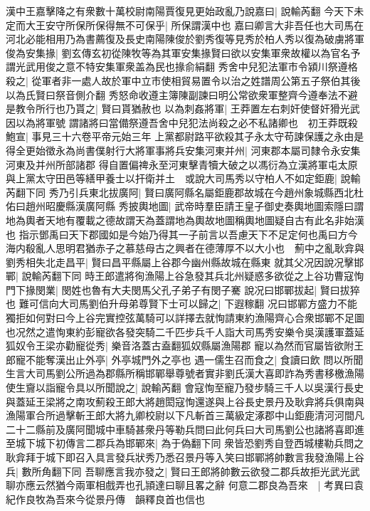 漢中王嘉擊降之有衆數十萬校尉南陽賈復見更始政亂乃說嘉曰|{
	說輸芮翻}
今天下未定而大王安守所保所保得無不可保乎|{
	所保謂漢中也}
嘉曰卿言大非吾任也大司馬在河北必能相用乃為書薦復及長史南陽陳俊於劉秀復等見秀於柏人秀以復為破虜將軍俊為安集掾|{
	劉玄傳玄初從陳牧等為其軍安集掾賢曰欲以安集軍衆故權以為官名予謂光武用俊之意不特安集軍衆盖為民也掾俞絹翻}
秀舍中兒犯法軍市令潁川祭遵格殺之|{
	從軍者非一處人故於軍中立市使相貿易置令以治之姓譜周公第五子祭伯其後以為氏賢曰祭音側介翻}
秀怒命收遵主簿陳副諫曰明公常欲衆軍整齊今遵奉法不避是教令所行也乃貰之|{
	賢曰貰猶赦也}
以為刺姦將軍|{
	王莽置左右刺奸使督奸猾光武因以為將軍號}
謂諸將曰當備祭遵吾舍中兒犯法尚殺之必不私諸卿也　初王莽既殺鮑宣|{
	事見三十六卷平帝元始三年}
上黨都尉路平欲殺其子永太守苟諫保護之永由是得全更始徵永為尚書僕射行大將軍事將兵安集河東并州|{
	河東郡本屬司隸令永安集河東及并州所部諸郡}
得自置偏禆永至河東擊青犢大破之以馮衍為立漢將軍屯太原與上黨太守田邑等繕甲養士以扞衛并土　或說大司馬秀以守柏人不如定鉅鹿|{
	說輸芮翻下同}
秀乃引兵東北拔廣阿|{
	賢曰廣阿縣名屬鉅鹿郡故城在今趙州象城縣西北杜佑曰趙州昭慶縣漢廣阿縣}
秀披輿地圖|{
	武帝時羣臣請王皇子御史奏輿地圖索隱曰謂地為輿者天地有覆載之德故謂天為蓋謂地為輿故地圖稱輿地圖疑自古有此名非始漢也}
指示鄧禹曰天下郡國如是今始乃得其一子前言以吾慮天下不足定何也禹曰方今海内殽亂人思明君猶赤子之慕慈母古之興者在德薄厚不以大小也　薊中之亂耿弇與劉秀相失北走昌平|{
	賢曰昌平縣屬上谷郡今幽州縣故城在縣東}
就其父况因說况擊邯鄲|{
	說輸芮翻下同}
時王郎遣將徇漁陽上谷急發其兵北州疑惑多欲從之上谷功曹寇恂門下掾閔業|{
	閔姓也魯有大夫閔馬父孔子弟子有閔子騫}
說况曰邯鄲拔起|{
	賢曰拔猝也}
難可信向大司馬劉伯升母弟尊賢下士可以歸之|{
	下遐稼翻}
况曰邯鄲方盛力不能獨拒如何對曰今上谷完實控弦萬騎可以詳擇去就恂請東約漁陽齊心合衆邯鄲不足圖也况然之遣恂東約彭寵欲各發突騎二千匹步兵千人詣大司馬秀安樂令吳漢護軍蓋延狐奴令王梁亦勸寵從秀|{
	樂音洛蓋古盍翻狐奴縣屬漁陽郡}
寵以為然而官屬皆欲附王郎寵不能奪漢出止外亭|{
	外亭城門外之亭也}
遇一儒生召而食之|{
	食讀曰飲}
問以所聞生言大司馬劉公所過為郡縣所稱邯鄲舉尊號者實非劉氏漢大喜即詐為秀書移檄漁陽使生齎以詣寵令具以所聞說之|{
	說輸芮翻}
會寇恂至寵乃發步騎三千人以吳漢行長史與蓋延王梁將之南攻薊殺王郎大將趙閎寇恂還遂與上谷長史景丹及耿弇將兵俱南與漁陽軍合所過擊斬王郎大將九卿校尉以下凡斬首三萬級定涿郡中山鉅鹿清河河間凡二十二縣前及廣阿聞城中車騎甚衆丹等勒兵問曰此何兵曰大司馬劉公也諸將喜即進至城下城下初傳言二郡兵為邯鄲來|{
	為于偽翻下同}
衆皆恐劉秀自登西城樓勒兵問之耿弇拜于城下即召入具言發兵狀秀乃悉召景丹等入笑曰邯鄲將帥數言我發漁陽上谷兵|{
	數所角翻下同}
吾聊應言我亦發之|{
	賢曰王郎將帥數云欲發二郡兵故拒光武光武聊亦應云然猶今兩軍相戲弄也孔頴達曰聊且畧之辭}
何意二郡良為吾來　|{
	考異曰袁紀作良牧為吾來今從景丹傳　韻釋良首也信也}

